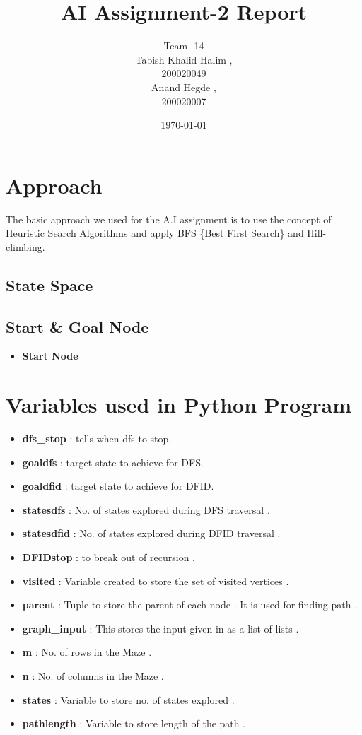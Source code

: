 \documentclass{article}
\title{AI Assignment-2 Report}
\date{\today}
\author{Team -14 \\Tabish Khalid Halim , \\ 200020049 \\ Anand Hegde , \\ 200020007}
\affil{Department of Computer Science, IIT Dharwad}
\begin{document}
\maketitle
{}
\newpage
\tableofcontents

\newpage
{}
\section{Approach}
The basic approach we used for the A.I assignment is to use the concept of Heuristic Search Algorithms and 
apply BFS \{Best First Search\} and Hill-climbing.
\vspace{10pt}
\subsection*{State Space}
\subsection*{Start \& Goal Node}
\begin{itemize}
    \item \textbf{Start Node} 
\end{itemize}
\newpage
\section{Variables used in Python Program}
\vspace{20pt}
\begin{itemize}
    \item \textbf{dfs\_stop} : tells when dfs to stop.
    \item \textbf{goaldfs} : target state to achieve for DFS.
    \item \textbf{goaldfid} : target state to achieve for DFID.
    \item \textbf{statesdfs} : No. of states explored during DFS traversal .
    \item \textbf{statesdfid} : No. of states explored during DFID traversal .
    \item \textbf{DFIDstop} : to break out of recursion .
    \item \textbf{visited} :  Variable created to store the set of visited vertices .
    \item \textbf{parent} : Tuple to store the parent of each node . It is used for finding path .
    \item \textbf{graph\_input} :  This stores the input given in as a list of lists .
    \item \textbf{m} : No. of rows in the Maze .
    \item \textbf{n} : No. of columns in the Maze .
    \item \textbf{states} : Variable to store no. of states explored .
    \item \textbf{pathlength} : Variable to store length of the path .
\end{itemize}
\newpage
\end{document}

